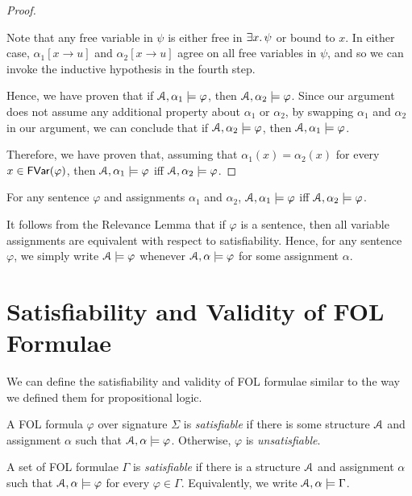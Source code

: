 \documentclass[11pt,usenames, dvipsnames]{article}
\begin{document}
\begin{proof}
\begin{description}
    Note that any free variable in $\psi$ is either free in $\exists x \ldotp \psi$ or bound to $x$. In either case, $\alpha_1[x \to u]$ and $\alpha_2[x \to u]$ agree on all free variables in $\psi$, and so we can invoke the inductive hypothesis in the fourth step.
  \end{description}

  Hence, we have proven that if $\struct, \alpha_1 \models \varphi$, then $\struct, \alpha_2 \models \varphi$. Since our argument does not assume any additional property about $\alpha_1$ or $\alpha_2$, by swapping $\alpha_1$ and $\alpha_2$ in our argument, we can conclude that if $\struct, \alpha_2 \models \varphi$, then $\struct, \alpha_1 \models \varphi$.

  Therefore, we have proven that, assuming that $\alpha_1(x) = \alpha_2(x)$ for every $x \in \mathsf{FVar}(\varphi)$, then $\struct, \alpha_1 \models \varphi$ iff $\struct, \alpha_2 \models \varphi$.
\end{proof}

\begin{corollary}
  For any sentence $\varphi$ and assignments $\alpha_1$ and $\alpha_2$, $\struct, \alpha_1 \models \varphi$ iff $\struct, \alpha_2 \models \varphi$.
\end{corollary}

It follows from the Relevance Lemma that if $\varphi$ is a sentence, then all variable assignments are equivalent with respect to satisfiability. Hence, for any sentence $\varphi$, we simply write $\struct \models \varphi$ whenever $\struct, \alpha \models \varphi$ for some assignment $\alpha$.

\section*{\large \centering Satisfiability and Validity of FOL Formulae}
\noindent

We can define the satisfiability and validity of FOL formulae similar to the way we defined them for propositional logic.

\begin{definition}[Satisfiability]
  A FOL formula $\varphi$ over signature $\Sigma$ is \emph{satisfiable} if there is some structure $\struct$ and assignment $\alpha$ such that $\struct, \alpha \models \varphi$. Otherwise, $\varphi$ is \emph{unsatisfiable}.
\end{definition}

\begin{definition}
  A set of FOL formulae $\Gamma$ is \emph{satisfiable} if there is a structure $\struct$ and assignment $\alpha$ such that $\struct, \alpha \models \varphi$ for every $\varphi \in \Gamma$. Equivalently, we write $\struct, \alpha \models \Gamma$.
\end{definition}
\end{document}
